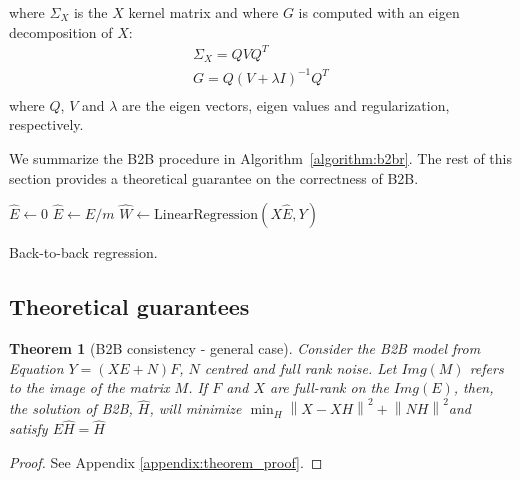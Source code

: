 \documentclass{article}
\newtheorem{theorem}{Theorem}
\begin{document}
where $\Sigma_X$ is the $X$ kernel matrix and where $G$ is computed with an eigen decomposition of $X$:
\begin{equation}
  \begin{aligned}
  \Sigma_X = Q V Q^T \\
  G = Q (V + \lambda I)^{-1} Q^T\\
  \end{aligned}
\end{equation}
where $Q$, $V$ and $\lambda$ are the eigen vectors, eigen values and regularization, respectively.

%

We summarize the B2B procedure in Algorithm~\ref{algorithm:b2br}.
%
The rest of this section provides a theoretical guarantee on the correctness of B2B.


\begin{algorithm}[H]
    $\hat{E} \leftarrow 0$\;
    $\hat{E} \leftarrow \hat{E} / m$\;
    $\hat{W} \leftarrow \text{LinearRegression}(X \hat{E}, Y)$\;
    \caption{Back-to-back regression.}
    \label{algorithm:b2br}
\end{algorithm}

\subsection{Theoretical guarantees}
\label{sec:theorem}

\begin{theorem}[B2B consistency - general case]

     Consider the B2B model from Equation $Y = (XE + N)F$, $N$ centred and full rank noise.
     Let $Img(M)$ refers to the image of the matrix $M$. If $F$ and $X$ are full-rank on the $Img(E)$, then, the solution of B2B, $\hat H$, will minimize
     $\min_H  \left \| X - XH\right\| ^2  + \left \| NH\right \| ^2$and satisfy $E\hat H = \hat H$
\end{theorem}
%
\begin{proof}
  See Appendix \ref{appendix:theorem_proof}.
\end{proof}
\end{document}
